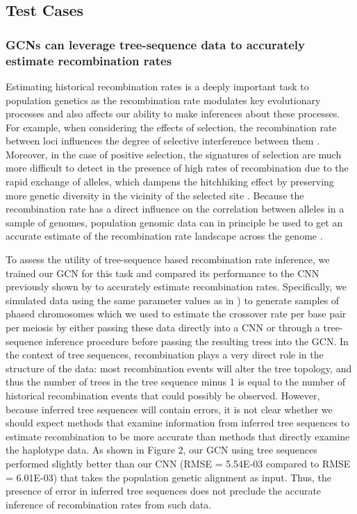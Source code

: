 \subsection{Test Cases}
\subsubsection{GCNs can leverage tree-sequence data to accurately estimate recombination rates}

Estimating historical recombination rates is a deeply important task to population genetics as the recombination rate modulates key evolutionary processes and also affects our ability to make inferences about these processes. For example, when considering the effects of selection, the recombination rate between loci influences the degree of selective interference between them \cite{hillEffectLinkageLimits1966}. Moreover, in the case of positive selection, the signatures of selection are much more difficult to detect in the presence of high rates of recombination due to the rapid exchange of alleles, which dampens the hitchhiking effect by preserving more genetic diversity in the vicinity of the selected site \cite{shrinerPotentialImpactRecombination2003}. Because the recombination rate has a direct influence on the correlation between alleles in a sample of genomes, population genomic data can in principle be used to get an accurate estimate of the recombination rate landscape across the genome \cite{adrionPredictingLandscapeRecombination2020,autonRecombinationRateEstimation2007,chanGenomeWideFineScaleRecombination2012,gaoNewSoftwareFast2016,hudsonTwolocusSamplingDistributions2001}. 

To assess the utility of tree-sequence based recombination rate inference, we trained our GCN for this task and compared its performance to the CNN previously shown by \cite{flagelUnreasonableEffectivenessConvolutional2019} to accurately estimate recombination rates. Specifically, we simulated data using the same parameter values as in \cite{flagelUnreasonableEffectivenessConvolutional2019}) to generate samples of phased chromosomes which we used to estimate the crossover rate per base pair per meiosis by either passing these data directly into a CNN or through a tree-sequence inference procedure before passing the resulting trees into the GCN. In the context of tree sequences, recombination plays a very direct role in the structure of the data: most recombination events will alter the tree topology, and thus the number of trees in the tree sequence minus 1 is equal to the number of historical recombination events that could possibly be observed. However, because inferred tree sequences will contain errors, it is not clear whether we should expect methods that examine information from inferred tree sequences to estimate recombination to be more accurate than methods that directly examine the haplotype data. As shown in Figure 2, our GCN using tree sequences performed slightly better than our CNN (RMSE = 5.54E-03 compared to RMSE = 6.01E-03) that takes the population genetic alignment as input. Thus, the presence of error in inferred tree sequences does not preclude the accurate inference of recombination rates from such data.

